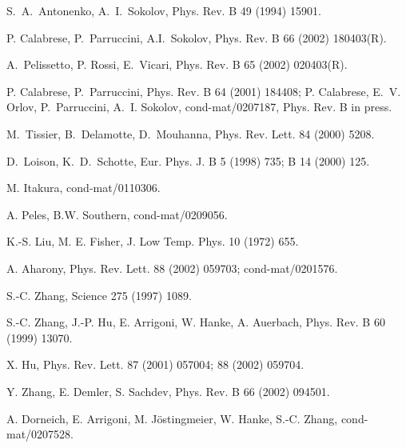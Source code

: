 \documentclass[a4paper,12pt]{article}
\begin{document}
\begin{thebibliography}{99}
S.~A.~Antonenko, A.~I.~Sokolov, Phys. Rev. B  49  (1994) 15901.

P. Calabrese, P.~Parruccini, A.I.~Sokolov,
Phys. Rev. B 66 (2002) 180403(R).

A.~Pelissetto, P. Rossi, E.~Vicari,
Phys. Rev. B  65 (2002) 020403(R).

P. Calabrese, P.~Parruccini, 
Phys. Rev. B 64 (2001) 184408;
P. Calabrese, E.~V. Orlov, P.~Parruccini, A.~I. Sokolov,
cond-mat/0207187, Phys. Rev. B in press.

M.~Tissier, B.~Delamotte, D.~Mouhanna,
Phys. Rev. Lett.  84  (2000) 5208.

D.~Loison, K.~D.~Schotte,
Eur. Phys. J. B  5  (1998) 735;
B  14  (2000) 125.

M. Itakura, cond-mat/0110306.

A. Peles, B.W. Southern, cond-mat/0209056.

K.-S. Liu, M. E. Fisher,
J. Low Temp. Phys. 10 (1972) 655.

A. Aharony, Phys. Rev. Lett.  88 (2002) 059703;
cond-mat/0201576. 

S.-C. Zhang, Science  275 (1997)  1089.

S.-C. Zhang, J.-P. Hu, E. Arrigoni, W. Hanke, A. Auerbach, 
Phys. Rev. B 60 (1999) 13070.

X. Hu, Phys. Rev. Lett.  87 (2001) 057004; 
88 (2002) 059704.

Y. Zhang, E. Demler, S. Sachdev,
Phys. Rev. B 66 (2002) 094501.

A. Dorneich, E. Arrigoni, M. J\"ostingmeier,
W. Hanke, S.-C. Zhang,  cond-mat/0207528.

\end{thebibliography}
\end{document}
